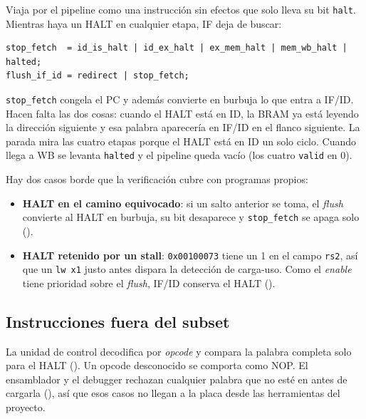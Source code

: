Viaja por el pipeline como una instrucción sin efectos que solo lleva su bit \texttt{halt}.
Mientras haya un HALT en cualquier etapa, IF deja de buscar:

\begin{lstlisting}[style=verilog,numbers=none]
stop_fetch  = id_is_halt | id_ex_halt | ex_mem_halt | mem_wb_halt | halted;
flush_if_id = redirect | stop_fetch;
\end{lstlisting}

\texttt{stop\_fetch} congela el PC y además convierte en burbuja lo que entra a IF/ID. Hacen falta
las dos cosas: cuando el HALT está en ID, la BRAM ya está leyendo la dirección siguiente y esa
palabra aparecería en IF/ID en el flanco siguiente. La parada mira las cuatro etapas porque el HALT
está en ID un solo ciclo. Cuando llega a WB se levanta \texttt{halted} y el pipeline queda vacío
(los cuatro \texttt{valid} en 0).

Hay dos casos borde que la verificación cubre con programas propios:
\begin{itemize}[nosep]
  \item \textbf{HALT en el camino equivocado}: si un salto anterior se toma, el \emph{flush}
        convierte al HALT en burbuja, su bit desaparece y \texttt{stop\_fetch} se apaga solo
        ().
  \item \textbf{HALT retenido por un stall}: \texttt{0x00100073} tiene un 1 en el campo
        \texttt{rs2}, así que un \texttt{lw x1} justo antes dispara la detección de carga-uso.
        Como el \emph{enable} tiene prioridad sobre el \emph{flush}, IF/ID conserva el HALT
        ().
\end{itemize}

\subsection{Instrucciones fuera del subset}

La unidad de control decodifica por \emph{opcode} y compara la palabra completa solo para el HALT
(). Un opcode desconocido se comporta como NOP. El ensamblador y el debugger
rechazan cualquier palabra que no esté en  antes de cargarla (), así
que esos casos no llegan a la placa desde las herramientas del proyecto.
